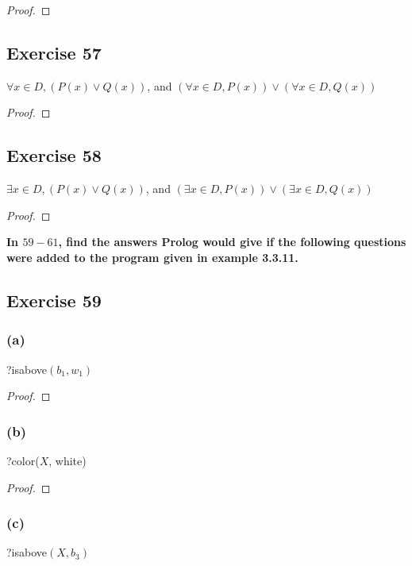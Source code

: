 \documentclass[14pt]{extarticle}
\newcommand{\fa}{\forall}
\newcommand{\te}{\exists}
\begin{document}
\begin{proof}

\end{proof}

\subsection{Exercise 57}
$\fa x \in D, (P(x) \vee Q(x))$, and $(\fa x \in D, P(x)) \vee (\fa x \in D, Q(x))$

\begin{proof}

\end{proof}

\subsection{Exercise 58}
$\te x \in D, (P(x) \vee Q(x))$, and $(\te x \in D, P(x)) \vee (\te x \in D, Q(x))$

\begin{proof}

\end{proof}

{\bf \color{cyan} In $59-61$, find the answers Prolog would give if the following questions were added to the program given in example 3.3.11.}

\subsection{Exercise 59}

\subsubsection{(a)}
?isabove$(b_1, w_1)$

\begin{proof}

\end{proof}

\subsubsection{(b)}
?color($X$, white)

\begin{proof}

\end{proof}

\subsubsection{(c)}
?isabove$(X, b_3)$
\end{document}
